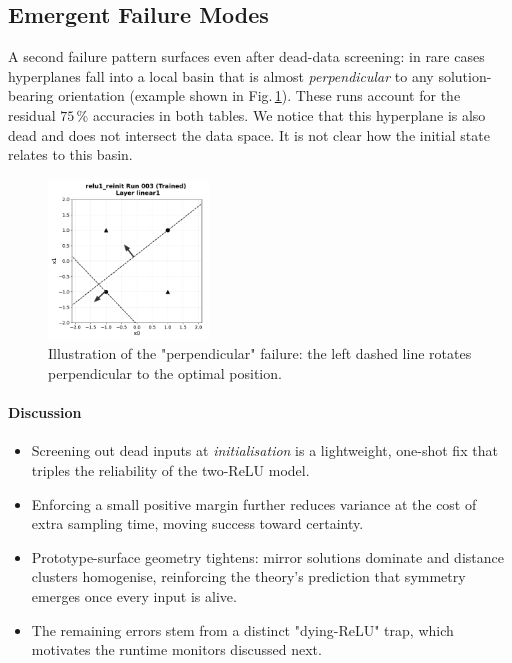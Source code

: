 \subsection*{Emergent Failure Modes}
A second failure pattern surfaces even after dead-data screening:
in rare cases hyperplanes fall into a local basin that is almost
\emph{perpendicular} to any solution-bearing orientation (example shown in Fig.\,\ref{fig:reinit-bad}).
These runs account for the residual $75\,\%$ accuracies in both tables. 
We notice that this hyperplane is also dead and does not intersect the data space.
It is not clear how the initial state relates to this basin.

\begin{figure}[h]
  \centering
  \includegraphics[width=0.38\textwidth]{relu1/figs/reinit_bad_example.pdf}
  \caption{Illustration of the "perpendicular" failure: the left dashed
           line rotates perpendicular to the optimal position.}
  \label{fig:reinit-bad}
\end{figure}

\paragraph{Discussion}
\begin{itemize}
  \item Screening out dead inputs at \emph{initialisation} is a
        lightweight, one-shot fix that triples the reliability of the
        two-ReLU model.
  \item Enforcing a small positive margin further reduces variance at the
        cost of extra sampling time, moving success toward certainty.
  \item Prototype-surface geometry tightens: mirror solutions dominate
        and distance clusters homogenise, reinforcing the theory's
        prediction that symmetry emerges once every input is alive.
  \item The remaining errors stem from a distinct "dying-ReLU" 
        trap, which motivates the runtime monitors discussed next.
\end{itemize}

\hrulefill
